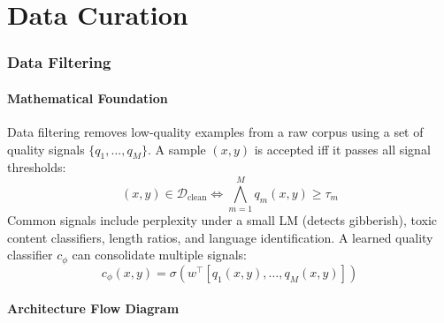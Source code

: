 \part{Data Curation}

\section{Data Filtering}

\subsection{Mathematical Foundation}
Data filtering removes low-quality examples from a raw corpus using a set of quality signals $\{q_1,\ldots,q_M\}$. A sample $(x,y)$ is accepted iff it passes all signal thresholds:
\begin{equation}
  (x,y) \in \mathcal{D}_{\text{clean}} \iff \bigwedge_{m=1}^M q_m(x,y) \geq \tau_m
\end{equation}
Common signals include perplexity under a small LM (detects gibberish), toxic content classifiers, length ratios, and language identification. A learned quality classifier $c_\phi$ can consolidate multiple signals:
\begin{equation}
  c_\phi(x,y) = \sigma(w^\top [q_1(x,y),\ldots,q_M(x,y)])
\end{equation}

\subsection{Architecture Flow Diagram}

